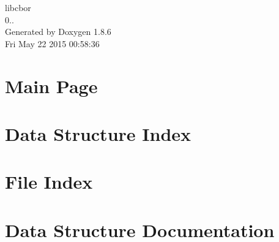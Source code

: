 \documentclass[twoside]{book}
\newcommand{\clearemptydoublepage}{%
  \newpage{\pagestyle{empty}\cleardoublepage}%
}
\begin{document}
\hypersetup{pageanchor=false}
\begin{titlepage}
\vspace*{7cm}
\begin{center}%
{\Large libcbor \\[1ex]\large 0.. }\\
\vspace*{1cm}
{\large Generated by Doxygen 1.8.6}\\
\vspace*{0.5cm}
{\small Fri May 22 2015 00:58:36}\\
\end{center}
\end{titlepage}
\clearemptydoublepage
\tableofcontents
\clearemptydoublepage
{}
\hypersetup{pageanchor=true}

\chapter{Main Page}
\label{index}\hypertarget{index}{}
\chapter{Data Structure Index}

\chapter{File Index}

\chapter{Data Structure Documentation}





















\end{document}
